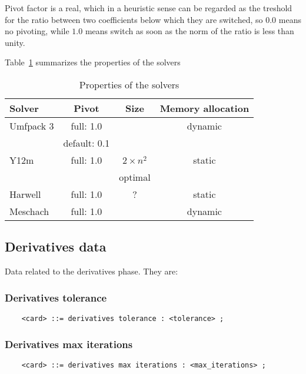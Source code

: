 \noindent
Pivot factor is a real, which in a heuristic sense can be regarded as
the treshold for the ratio between two coefficients below which they are
switched, so $ 0.0 $ means no pivoting, while $ 1.0 $ means switch as
soon as the norm of the ratio is less than unity.

\noindent
Table~\ref{tab:solvers} summarizes the properties of the solvers

\begin{table}
\centering
\caption{Properties of the solvers}\label{tab:solvers}
\begin{tabular}{lccc}
Solver & Pivot & Size & Memory allocation \\
\hline
Umfpack 3	& full: 1.0 	& 			& dynamic \\
 		& default: 0.1 	&			& \\
Y12m 		& full: 1.0 	& $2 \times n^2 $	& static \\
		&		& optimal		& \\
Harwell		& full: 1.0	& ?			& static \\
Meschach	& full: 1.0	& 			& dynamic
\end{tabular}
\end{table}



\subsection{Derivatives data}
Data related to the derivatives phase. They are:


\subsubsection{Derivatives tolerance}
\begin{verbatim}
    <card> ::= derivatives tolerance : <tolerance> ;
\end{verbatim}

\subsubsection{Derivatives max iterations}
\begin{verbatim}
    <card> ::= derivatives max iterations : <max_iterations> ;
\end{verbatim}

